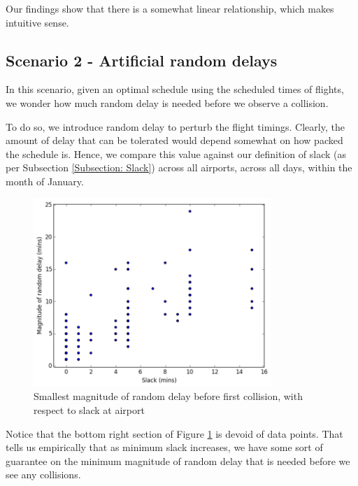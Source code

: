 \documentclass[12pt, a4paper]{report}
\begin{document}
Our findings show that there is a somewhat linear relationship, which makes intuitive sense.


\newpage
\subsection{Scenario 2 - Artificial random delays}
In this scenario, given an optimal schedule using the scheduled times of flights, we wonder how much random delay is needed before we observe a collision.

To do so, we introduce random delay to perturb the flight timings. Clearly, the amount of delay that can be tolerated would depend somewhat on how packed the schedule is. Hence, we compare this value against our definition of slack (as per Subsection \ref{Subsection: Slack}) across all airports, across all days, within the month of January.

\begin{figure}[h!]
\centering
\includegraphics[width=0.8\textwidth]{../graph/3ai.png}
\caption{Smallest magnitude of random delay before first collision, with respect to slack at airport}
\label{fig:SmallestDelay}
\end{figure}

Notice that the bottom right section of Figure \ref{fig:SmallestDelay} is devoid of data points. That tells us empirically that as minimum slack increases, we have some sort of guarantee on the minimum magnitude of random delay that is needed before we see any collisions.
\end{document}
